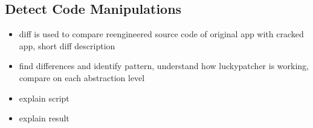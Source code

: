 \subsection{Detect Code Manipulations} \label{subsection:forensics-tools-diff}
\begin{itemize}
  \item diff is used to compare reengineered source code of original app with cracked app, short diff description
  \item find differences and identify pattern, understand how luckypatcher is working, compare on each abstraction level
  \item explain script
  \item explain result
\end{itemize}



